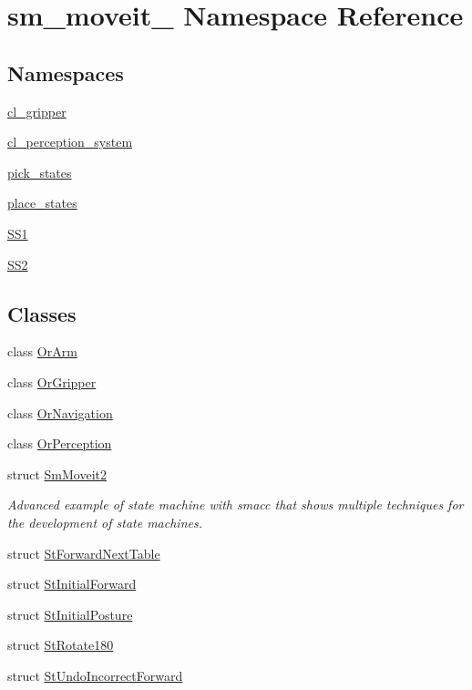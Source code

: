 \hypertarget{namespacesm__moveit__2}{}\section{sm\+\_\+moveit\+\_ Namespace Reference}
\label{namespacesm__moveit__2}
\subsection*{Namespaces}
\begin{DoxyCompactItemize}
\item 
 \hyperlink{namespacesm__moveit__2_1_1cl__gripper}{cl\+\_\+gripper}
\item 
 \hyperlink{namespacesm__moveit__2_1_1cl__perception__system}{cl\+\_\+perception\+\_\+system}
\item 
 \hyperlink{namespacesm__moveit__2_1_1pick__states}{pick\+\_\+states}
\item 
 \hyperlink{namespacesm__moveit__2_1_1place__states}{place\+\_\+states}
\item 
 \hyperlink{namespacesm__moveit__2_1_1SS1}{S\+S1}
\item 
 \hyperlink{namespacesm__moveit__2_1_1SS2}{S\+S2}
\end{DoxyCompactItemize}
\subsection*{Classes}
\begin{DoxyCompactItemize}
\item 
class \hyperlink{classsm__moveit__2_1_1OrArm}{Or\+Arm}
\item 
class \hyperlink{classsm__moveit__2_1_1OrGripper}{Or\+Gripper}
\item 
class \hyperlink{classsm__moveit__2_1_1OrNavigation}{Or\+Navigation}
\item 
class \hyperlink{classsm__moveit__2_1_1OrPerception}{Or\+Perception}
\item 
struct \hyperlink{structsm__moveit__2_1_1SmMoveit2}{Sm\+Moveit2}
\begin{DoxyCompactList}\small\item\em Advanced example of state machine with smacc that shows multiple techniques for the development of state machines. \end{DoxyCompactList}\item 
struct \hyperlink{structsm__moveit__2_1_1StForwardNextTable}{St\+Forward\+Next\+Table}
\item 
struct \hyperlink{structsm__moveit__2_1_1StInitialForward}{St\+Initial\+Forward}
\item 
struct \hyperlink{structsm__moveit__2_1_1StInitialPosture}{St\+Initial\+Posture}
\item 
struct \hyperlink{structsm__moveit__2_1_1StRotate180}{St\+Rotate180}
\item 
struct \hyperlink{structsm__moveit__2_1_1StUndoIncorrectForward}{St\+Undo\+Incorrect\+Forward}
\end{DoxyCompactItemize}
